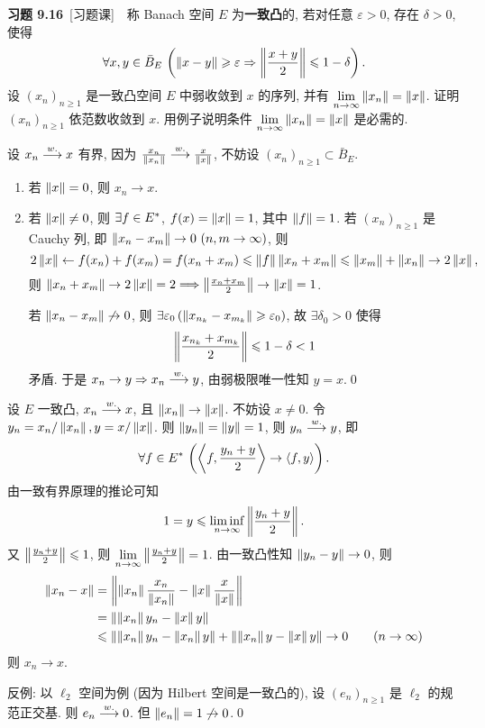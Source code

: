 	\textbf{习题 9.16}\ [习题课]\ \ 称 Banach 空间 $ E $ 为\textbf{一致凸}的, 若对任意 $ \varepsilon>0 $, 存在 $ \delta>0 $, 使得
	\[
		\forall x, y\in\bar{B}_{E}\,\left(\left\| x-y \right\|\geqslant\varepsilon\Rightarrow \left\| \frac{x+y}{2} \right\|\leqslant 1-\delta\right).
	\]
	设 $ (x_{n})_{n\geqslant1} $ 是一致凸空间 $ E $ 中弱收敛到 $ x $ 的序列, 并有 $ \lim\limits_{n\to\infty}\left\| x_{n} \right\|=\left\| x \right\| $. 证明 $ (x_{n})_{n\geqslant1} $ 依范数收敛到 $ x $. 用例子说明条件 $ \lim\limits_{n\to\infty}\left\| x_{n} \right\|=\left\| x \right\| $ 是必需的.
	\begin{Proof}
		设 $ x_{n}\overset{w.}{\longrightarrow} x $ 有界, 因为 $ \frac{x_{n}}{\left\| x_{n} \right\|}\overset{w.}{\longrightarrow}\frac{x}{\left\| x \right\|} $, 不妨设 $ (x_{n})_{n\geqslant1}\subset\bar{B}_{E} $.
		\begin{enumerate}[(1)]
			\item 若 $ \left\| x \right\|=0 $, 则 $ x_{n}\to x $.
			\item 若 $ \left\| x \right\|\ne 0 $, 则 $ \exists f\in E^{*} $, $ f(x)=\left\| x \right\|=1 $, 其中 $ \left\| f \right\|=1 $. 若 $ (x_{n})_{n\geqslant1} $ 是 Cauchy 列, 即 $ \norm{x_{n}- x_{m}}\to 0\ (n, m\to\infty) $, 则
			\[
				2\left\| x \right\|\leftarrow f(x_{n})+f(x_{m})=f(x_{n}+x_{m})\leqslant\left\| f \right\|\left\| x_{n}+x_{m} \right\|\leqslant\left\| x_{m} \right\|+\left\| x_{n} \right\|\to 2\left\| x \right\|,
			\]
			则 $ \left\| x_{n}+x_{m} \right\|\to 2\left\| x \right\|=2\Longrightarrow \left\| \frac{x_{n}+x_{m}}{2} \right\|\to \left\| x \right\|=1 $.

			若 $ \left\| x_{n}-x_{m} \right\|\not\to 0 $, 则 $ \exists\varepsilon_{0}\,(\left\| x_{n_{k}}-x_{m_{k}} \right\|\geqslant\varepsilon_{0}) $, 故 $ \exists \delta_{0}>0 $ 使得
			\[
				\left\| \frac{x_{n_{k}}+x_{m_{k}}}{2} \right\|\leqslant1-\delta<1
			\]
			矛盾. 于是 $ x_{n}\to y\Rightarrow x_{n}\overset{w.}{\longrightarrow} y $, 由弱极限唯一性知 $ y=x $.\qed
		\end{enumerate}
	\end{Proof}
	\begin{Proof}[另证]
		设 $ E $ 一致凸, $ x_{n}\overset{w.}{\longrightarrow} x $, 且 $ \left\| x_{n} \right\|\to\left\| x \right\| $. 不妨设 $ x\ne 0 $. 令 $ y_{n}=x_{n}/\left\| x_{n} \right\|, y=x/\left\| x \right\| $. 则 $ \left\| y_{n} \right\|=\left\| y \right\|=1 $, 则 $ y_{n}\overset{w.}{\longrightarrow} y $, 即
		\[
			\forall f\in E^{*}\,\left( \left\langle f, \frac{y_{n}+y}{2} \right\rangle\to \left\langle f, y \right\rangle \right).
		\]
		由一致有界原理的推论可知
		\[
			1=y\leqslant\liminf_{n\to\infty}\left\| \frac{y_{n}+y}{2} \right\|.
		\]
		又 $ \left\| \frac{y_{n}+y}{2} \right\|\leqslant1 $, 则 $ \lim\limits_{n\to\infty}\left\| \frac{y_{n}+y}{2} \right\|=1 $. 由一致凸性知 $ \left\| y_{n}-y \right\|\to 0 $, 则
		\[
			\begin{aligned}
				\left\| x_{n}-x \right\| & = \left\| \left\| x_{n} \right\|\frac{x_{n}}{\left\| x_{n} \right\|}-\left\| x \right\|\frac{x}{\left\| x \right\|} \right\|\\
				& = \left\| \left\| x_{n} \right\|y_{n}-\left\| x \right\|y \right\|\\
				& \leqslant\left\| \left\| x_{n} \right\|y_{n}-\left\| x_{n} \right\|y \right\|+\left\| \left\| x_{n} \right\|y-\left\| x \right\|y \right\|\to 0\qquad (n\to\infty)
			\end{aligned}
		\]
		则 $ x_{n}\to x $.

		反例: 以 $ \ell_{2} $ 空间为例 (因为 Hilbert 空间是一致凸的), 设 $ (e_{n})_{n\geqslant1} $ 是 $ \ell_{2} $ 的规范正交基. 则 $ e_{n}\overset{w.}{\longrightarrow} 0 $. 但 $ \left\| e_{n} \right\|=1\not\to 0 $.\qed
	\end{Proof}

